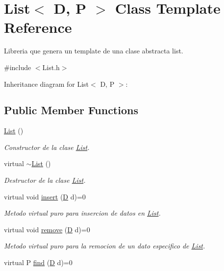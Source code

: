 \hypertarget{class_list}{\section{List$<$ D, P $>$ Class Template Reference}
\label{class_list}
}


Libreria que genera un template de una clase abstracta list.  




{\ttfamily \#include $<$List.\+h$>$}



Inheritance diagram for List$<$ D, P $>$\+:
\subsection*{Public Member Functions}
\begin{DoxyCompactItemize}
\item 
\hyperlink{class_list_a3deb54ab4f51c6c39aa4015f258b5812}{List} ()
\begin{DoxyCompactList}\small\item\em Constructor de la clase \hyperlink{class_list}{List}. \end{DoxyCompactList}\item 
virtual \hyperlink{class_list_a624593fb77847bf7ad4cacfba3442471}{$\sim$\+List} ()
\begin{DoxyCompactList}\small\item\em Destructor de la clase \hyperlink{class_list}{List}. \end{DoxyCompactList}\item 
virtual void \hyperlink{class_list_a01f588d87d47f8332928eca38f7b11bb}{insert} (\hyperlink{gwp_2main_8cpp_af316c33cc298530f245e8b55330e86b5}{D} d)=0
\begin{DoxyCompactList}\small\item\em Metodo virtual puro para insercion de datos en \hyperlink{class_list}{List}. \end{DoxyCompactList}\item 
virtual void \hyperlink{class_list_a14fc4e853102018df78db3899aa00d71}{remove} (\hyperlink{gwp_2main_8cpp_af316c33cc298530f245e8b55330e86b5}{D} d)=0
\begin{DoxyCompactList}\small\item\em Metodo virtual puro para la remocion de un dato especifico de \hyperlink{class_list}{List}. \end{DoxyCompactList}\item 
virtual P \hyperlink{class_list_a2b40d6fffc7b2fb5138b648f52c839ee}{find} (\hyperlink{gwp_2main_8cpp_af316c33cc298530f245e8b55330e86b5}{D} d)=0

\end{DoxyCompactItemize}
